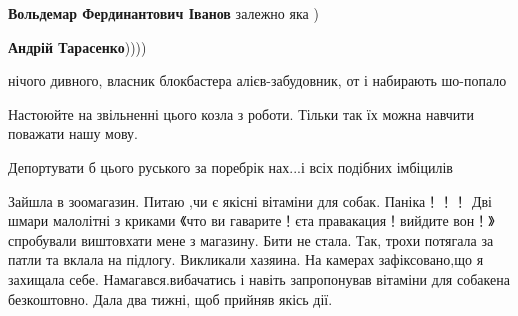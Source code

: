 \begin{itemize}
\begin{itemize}
\textbf{Вольдемар Фердинантович Іванов} залежно яка )

 
\textbf{Андрій Тарасенко}))))
\end{itemize}

 
нічого дивного, власник блокбастера алієв-забудовник, от і набирають шо-попало

 
Настоюйте на звільненні цього козла з роботи. Тільки так їх можна навчити поважати нашу мову.

 
Депортувати б цього руського за поребрік нах...і всіх подібних імбіцилів

 

Зайшла в зоомагазин. Питаю ,чи є якісні вітаміни для собак. Паніка！！！ Дві
шмари малолітні з криками 《что ви гаварите！єта правакация！вийдите
вон！》спробували виштовхати мене з магазину. Бити не стала. Так, трохи
потягала за патли та вклала на підлогу. Викликали хазяина. На камерах
зафіксовано,що я захищала себе. Намагався.вибачатись і навіть запропонував
вітаміни для собакена безкоштовно. Дала два тижні, щоб прийняв якісь дії.

\begin{itemize}
 

\end{itemize}
\end{itemize}
